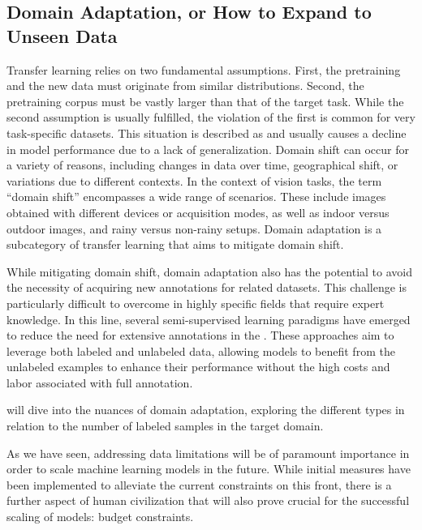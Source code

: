 \subsection{Domain Adaptation, or How to Expand to Unseen Data}\label{subsec:da_intro}
Transfer learning relies on two fundamental assumptions. First, the pretraining and the new data must originate from similar distributions. Second, the pretraining corpus must be vastly larger than that of the target task. While the second assumption is usually fulfilled, the violation of the first is common for very task-specific datasets. This situation is described as  and usually causes a decline in model performance due to a lack of generalization. Domain shift can occur for a variety of reasons, including changes in data over time, geographical shift, or variations due to different contexts. In the context of vision tasks, the term ``domain shift'' encompasses a wide range of scenarios. These include images obtained with different devices or acquisition modes, as well as indoor versus outdoor images, and rainy versus non-rainy setups. Domain adaptation is a subcategory of transfer learning that aims to mitigate domain shift.

While mitigating domain shift, domain adaptation also has the potential to avoid the necessity of acquiring new annotations for related datasets. This challenge is particularly difficult to overcome in highly specific fields that require expert knowledge. In this line, several semi-supervised learning paradigms have emerged to reduce the need for extensive annotations in the . These approaches aim to leverage both labeled and unlabeled data, allowing models to benefit from the unlabeled examples to enhance their performance without the high costs and labor associated with full annotation. 


 will dive into the nuances of domain adaptation, exploring the different types in relation to the number of labeled samples in the target domain.

\sectionlinenew

As we have seen, addressing data limitations will be of paramount importance in order to scale machine learning models in the future. While initial measures have been implemented to alleviate the current constraints on this front, there is a further aspect of human civilization that will also prove crucial for the successful scaling of models: budget constraints.
